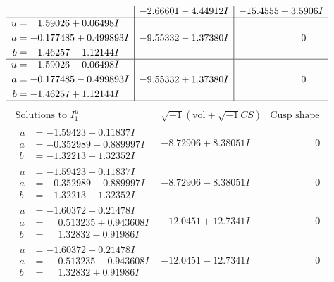 \documentclass[1p]{elsarticle_modified}
\theoremstyle{definition}
\newcommand{\I}{\sqrt{-1}}
\begin{document}
$$\begin{array}{c|c|c}
 & -2.66601 - 4.44912 I & -15.4555 + 3.5906 I \\ \hline\begin{aligned}
u &= \phantom{-}1.59026 + 0.06498 I \\
a &= -0.177485 + 0.499893 I \\
b &= -1.46257 - 1.12144 I\end{aligned}
 & -9.55332 - 1.37380 I & \phantom{-0.000000 } 0 \\ \hline\begin{aligned}
u &= \phantom{-}1.59026 - 0.06498 I \\
a &= -0.177485 - 0.499893 I \\
b &= -1.46257 + 1.12144 I\end{aligned}
 & -9.55332 + 1.37380 I & \phantom{-0.000000 } 0\\
 \hline 
 \end{array}$$\newpage$$\begin{array}{c|c|c}  
\text{Solutions to }I^u_{1}& \I (\text{vol} + \sqrt{-1}CS) & \text{Cusp shape}\\
 \hline 
\begin{aligned}
u &= -1.59423 + 0.11837 I \\
a &= -0.352989 - 0.889997 I \\
b &= -1.32213 + 1.32352 I\end{aligned}
 & -8.72906 + 8.38051 I & \phantom{-0.000000 } 0 \\ \hline\begin{aligned}
u &= -1.59423 - 0.11837 I \\
a &= -0.352989 + 0.889997 I \\
b &= -1.32213 - 1.32352 I\end{aligned}
 & -8.72906 - 8.38051 I & \phantom{-0.000000 } 0 \\ \hline\begin{aligned}
u &= -1.60372 + 0.21478 I \\
a &= \phantom{-}0.513235 + 0.943608 I \\
b &= \phantom{-}1.32832 - 0.91986 I\end{aligned}
 & -12.0451 + 12.7341 I & \phantom{-0.000000 } 0 \\ \hline\begin{aligned}
u &= -1.60372 - 0.21478 I \\
a &= \phantom{-}0.513235 - 0.943608 I \\
b &= \phantom{-}1.32832 + 0.91986 I\end{aligned}
 & -12.0451 - 12.7341 I & \phantom{-0.000000 } 0 \\ \hline\begin{aligned}

\end{aligned}
\end{array}$$
\end{document}
